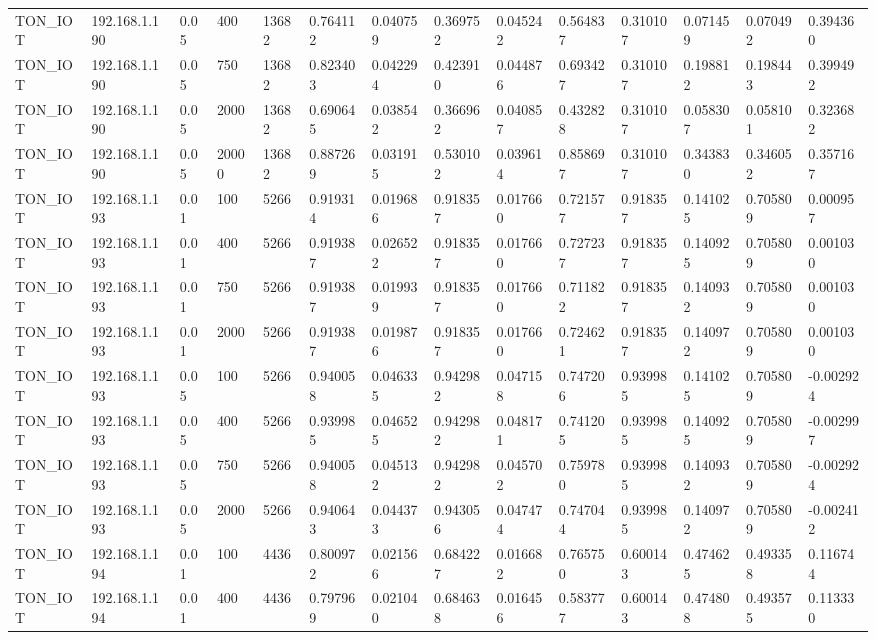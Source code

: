 \begin{tabular}{llllllllllllll}
TON\_IOT & 192.168.1.190 & 0.05 & 400 & 13682 & 0.764112 & 0.040759 & 0.369752 & 0.045242 & 0.564837 & 0.310107 & 0.071459 & 0.070492 & 0.394360 \\
TON\_IOT & 192.168.1.190 & 0.05 & 750 & 13682 & 0.823403 & 0.042294 & 0.423910 & 0.044876 & 0.693427 & 0.310107 & 0.198812 & 0.198443 & 0.399492 \\
TON\_IOT & 192.168.1.190 & 0.05 & 2000 & 13682 & 0.690645 & 0.038542 & 0.366962 & 0.040857 & 0.432828 & 0.310107 & 0.058307 & 0.058101 & 0.323682 \\
TON\_IOT & 192.168.1.190 & 0.05 & 20000 & 13682 & 0.887269 & 0.031915 & 0.530102 & 0.039614 & 0.858697 & 0.310107 & 0.343830 & 0.346052 & 0.357167 \\
TON\_IOT & 192.168.1.193 & 0.01 & 100 & 5266 & 0.919314 & 0.019686 & 0.918357 & 0.017660 & 0.721577 & 0.918357 & 0.141025 & 0.705809 & 0.000957 \\
TON\_IOT & 192.168.1.193 & 0.01 & 400 & 5266 & 0.919387 & 0.026522 & 0.918357 & 0.017660 & 0.727237 & 0.918357 & 0.140925 & 0.705809 & 0.001030 \\
TON\_IOT & 192.168.1.193 & 0.01 & 750 & 5266 & 0.919387 & 0.019939 & 0.918357 & 0.017660 & 0.711822 & 0.918357 & 0.140932 & 0.705809 & 0.001030 \\
TON\_IOT & 192.168.1.193 & 0.01 & 2000 & 5266 & 0.919387 & 0.019876 & 0.918357 & 0.017660 & 0.724621 & 0.918357 & 0.140972 & 0.705809 & 0.001030 \\
TON\_IOT & 192.168.1.193 & 0.05 & 100 & 5266 & 0.940058 & 0.046335 & 0.942982 & 0.047158 & 0.747206 & 0.939985 & 0.141025 & 0.705809 & -0.002924 \\
TON\_IOT & 192.168.1.193 & 0.05 & 400 & 5266 & 0.939985 & 0.046525 & 0.942982 & 0.048171 & 0.741205 & 0.939985 & 0.140925 & 0.705809 & -0.002997 \\
TON\_IOT & 192.168.1.193 & 0.05 & 750 & 5266 & 0.940058 & 0.045132 & 0.942982 & 0.045702 & 0.759780 & 0.939985 & 0.140932 & 0.705809 & -0.002924 \\
TON\_IOT & 192.168.1.193 & 0.05 & 2000 & 5266 & 0.940643 & 0.044373 & 0.943056 & 0.047474 & 0.747044 & 0.939985 & 0.140972 & 0.705809 & -0.002412 \\
TON\_IOT & 192.168.1.194 & 0.01 & 100 & 4436 & 0.800972 & 0.021566 & 0.684227 & 0.016682 & 0.765750 & 0.600143 & 0.474625 & 0.493358 & 0.116744 \\
TON\_IOT & 192.168.1.194 & 0.01 & 400 & 4436 & 0.797969 & 0.021040 & 0.684638 & 0.016456 & 0.583777 & 0.600143 & 0.474808 & 0.493575 & 0.113330 \\

\end{tabular}
